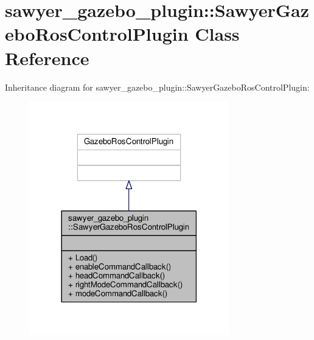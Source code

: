 \hypertarget{classsawyer__gazebo__plugin_1_1_sawyer_gazebo_ros_control_plugin}{\section{sawyer\-\_\-gazebo\-\_\-plugin\-:\-:Sawyer\-Gazebo\-Ros\-Control\-Plugin Class Reference}
\label{classsawyer__gazebo__plugin_1_1_sawyer_gazebo_ros_control_plugin}
}


Inheritance diagram for sawyer\-\_\-gazebo\-\_\-plugin\-:\-:Sawyer\-Gazebo\-Ros\-Control\-Plugin\-:\nopagebreak
\begin{figure}[H]
\begin{center}
\leavevmode
\includegraphics[width=246pt]{classsawyer__gazebo__plugin_1_1_sawyer_gazebo_ros_control_plugin__inherit__graph}
\end{center}
\end{figure}


